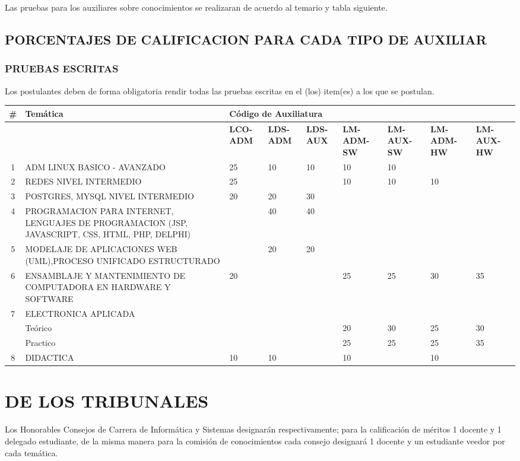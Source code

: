 \documentclass[letterpaper,11pt]{article}
\begin{document}
Las pruebas para los auxiliares sobre conocimientos se realizaran de acuerdo al temario y tabla siguiente.

\subsection{PORCENTAJES DE CALIFICACION PARA CADA TIPO DE AUXILIAR}
\subsubsection{PRUEBAS ESCRITAS}
Los postulantes deben de forma obligatoria rendir todas las pruebas escritas en el (los) item(es) a los que se postulan.

\begin{tabular}{|c|p{5.8cm}|p{0.8cm}|p{0.8cm}|p{0.8cm}|p{0.8cm}|p{0.8cm}|p{0.8cm}|p{0.8cm}|}
\hline
 \textbf{\#  } & \textbf{Temática} & \multicolumn{7}{|l|}{\textbf{Código de Auxiliatura}} \\
\hline
  &  & \textbf{\textbf{LCO-ADM}} & \textbf{LDS-ADM} & \textbf{LDS-AUX} & \textbf{LM-ADM-SW} & \textbf{LM-AUX-SW} & \textbf{LM-ADM-HW} & \textbf{LM-AUX-HW} \\
\hline
 1 & ADM LINUX BASICO - AVANZADO & 25 & 10 & 10 & 10 & 10 &  &  \\
\hline
 2 & REDES NIVEL INTERMEDIO & 25 &  &  & 10 & 10 & 10 &  \\
\hline
 3 & POSTGRES, MYSQL NIVEL INTERMEDIO & 20 & 20 & 30 &  &  &  &  \\
\hline
 4 & PROGRAMACION PARA INTERNET, LENGUAJES DE PROGRAMACION (JSP, JAVASCRIPT, CSS, HTML, PHP, DELPHI) &  & 40 & 40 &  &  &  &  \\
\hline
 5 & MODELAJE DE APLICACIONES WEB (UML),PROCESO UNIFICADO ESTRUCTURADO &  & 20 & 20 &  &  &  &  \\
\hline
 6 & ENSAMBLAJE Y MANTENIMIENTO DE COMPUTADORA EN HARDWARE Y SOFTWARE & 20 &  &  & 25 & 25 & 30 & 35 \\
\hline
 7 & ELECTRONICA APLICADA & \multicolumn{7}{|l|}{} \\
\hline
  & Teórico &  &  &  & 20 & 30 & 25 & 30 \\
\hline
  & Practico &  &  &  & 25 & 25 & 25 & 35 \\
\hline
 8 & DIDACTICA & 10 & 10 &  & 10 &  & 10 &  \\
\hline
\end{tabular}

\section{DE LOS TRIBUNALES}
Los Honorables Consejos de Carrera de Informática y Sistemas designarán respectivamente; para la calificación de méritos 1 docente y 1 delegado estudiante, de la misma manera para la comisión de conocimientos cada consejo designará 1 docente y un estudiante veedor por cada temática.
\end{document}
